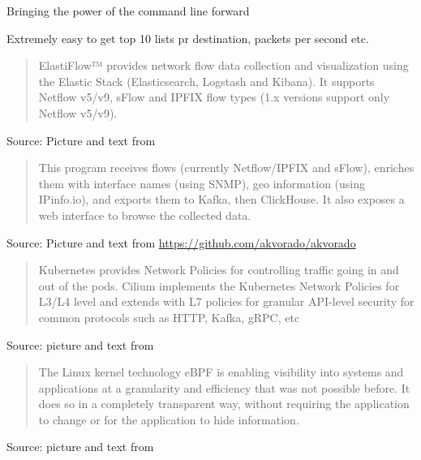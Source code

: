 \documentclass[Screen16to9,17pt]{foils}
\begin{document}
\begin{list2}
\item Bringing the power of the command line forward
\item Extremely easy to get top 10 lists pr destination, packets per second etc.
\end{list2}



\begin{quote}
  ElastiFlow™ provides network flow data collection and visualization using the Elastic Stack (Elasticsearch, Logstash and Kibana). It supports Netflow v5/v9, sFlow and IPFIX flow types (1.x versions support only Netflow v5/v9).
\end{quote}
Source: Picture and text from  \\



\begin{quote}
This program receives flows (currently Netflow/IPFIX and sFlow), enriches them with interface names (using SNMP), geo information (using IPinfo.io), and exports them to Kafka, then ClickHouse. It also exposes a web interface to browse the collected data.
\end{quote}
Source: Picture and text from \url{https://github.com/akvorado/akvorado}





\begin{quote}
Kubernetes provides Network Policies for controlling traffic going in and out of the pods. Cilium implements the Kubernetes Network Policies for L3/L4 level and extends with L7 policies for granular API-level security for common protocols such as HTTP, Kafka, gRPC, etc
\end{quote}
Source: picture and text from 



\begin{quote}
The Linux kernel technology eBPF is enabling visibility into systems and applications at a granularity and efficiency that was not possible before. It does so in a completely transparent way, without requiring the application to change or for the application to hide information.
\end{quote}
Source: picture and text from 
\end{document}
